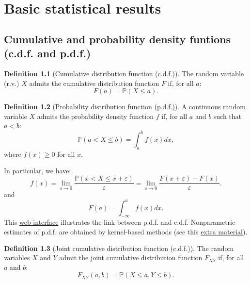 \documentclass[
  12pt,
]{book}
\theoremstyle{definition}
\newtheorem{definition}{Definition}[chapter]
\theoremstyle{definition}
\theoremstyle{definition}
\theoremstyle{definition}
\theoremstyle{remark}
\begin{document}
\hypertarget{Basics}{%
\chapter{Basic statistical results}\label{Basics}}

\hypertarget{cumulative-and-probability-density-funtions-c.d.f.-and-p.d.f.}{%
\section{Cumulative and probability density funtions (c.d.f. and p.d.f.)}\label{cumulative-and-probability-density-funtions-c.d.f.-and-p.d.f.}}

\begin{definition}[Cumulative distribution function (c.d.f.)]
\protect\hypertarget{def:cdf}{}\label{def:cdf}The random variable (r.v.) \(X\) admits the cumulative distribution function \(F\) if, for all \(a\):
\[
F(a)=\mathbb{P}(X \le a).
\]
\end{definition}

\begin{definition}[Probability distribution function (p.d.f.)]
\protect\hypertarget{def:pdf}{}\label{def:pdf}A continuous random variable \(X\) admits the probability density function \(f\) if, for all \(a\) and \(b\) such that \(a<b\):
\[
\mathbb{P}(a < X \le b) = \int_{a}^{b}f(x)dx,
\]
where \(f(x) \ge 0\) for all \(x\).
\end{definition}

In particular, we have:
\begin{equation}
f(x) = \lim_{\varepsilon \rightarrow 0} \frac{\mathbb{P}(x < X \le x + \varepsilon)}{\varepsilon} = \lim_{\varepsilon \rightarrow 0} \frac{F(x + \varepsilon)-F(x)}{\varepsilon}.\label{eq:flim}
\end{equation}
and
\[
F(a) = \int_{-\infty}^{a}f(x)dx.
\]
This \href{https://jrenne.shinyapps.io/density/}{web interface} illustrates the link between p.d.f. and c.d.f. Nonparametric estimates of p.d.f. are obtained by kernel-based methods (see this \href{https://www.dropbox.com/s/lxkllp9yewh98d8/Additional_Kernel.pdf?dl=0}{extra material}).

\begin{definition}[Joint cumulative distribution function (c.d.f.)]
\protect\hypertarget{def:jointcdf}{}\label{def:jointcdf}The random variables \(X\) and \(Y\) admit the joint cumulative distribution function \(F_{XY}\) if, for all \(a\) and \(b\):
\[
F_{XY}(a,b)=\mathbb{P}(X \le a,Y \le b).
\]
\end{definition}
\end{document}
